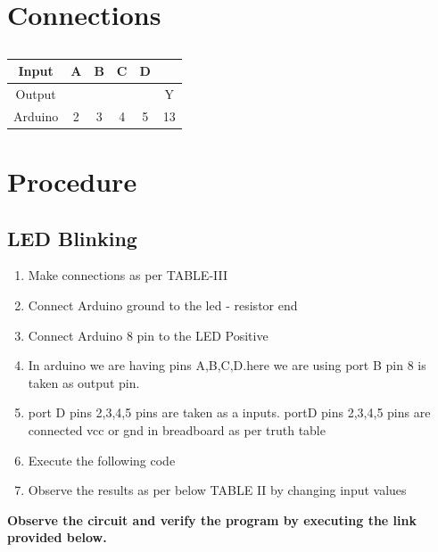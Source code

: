 \documentclass[journal,12pt,twocolumn]{IEEEtran}
\begin{document}
\pagebreak
\section{\textbf{Connections}}
\begin{table}[!h]
\begin{tabular}{|c|c|c|c|c|c|}
\hline
\centering
Input & A & B & C & D & \\ 
\hline 
Output &  &  &  &  & Y\\
\hline
Arduino & 2 & 3 & 4 & 5 & 13\\


\hline
\end{tabular}
\centering 
\label{}
\caption{}

\end{table}

\section{Procedure}

\subsection{LED Blinking}
\begin{enumerate}
\item Make connections as per TABLE-III
\item Connect Arduino ground to the led - resistor end
\item Connect Arduino 8 pin to the LED Positive
\item In arduino we are having pins A,B,C,D.here we are using port B pin 8 is taken as output pin.
\item port D pins 2,3,4,5 pins are taken as a inputs. portD pins 2,3,4,5 pins are connected vcc or gnd in breadboard as per truth table
\item Execute the following code
\item Observe the results as per below TABLE II by changing input values
\end{enumerate}


\textbf{Observe the circuit and verify the program by executing the link provided below.}\\
\begin{center}
\end{center}
\end{document}
